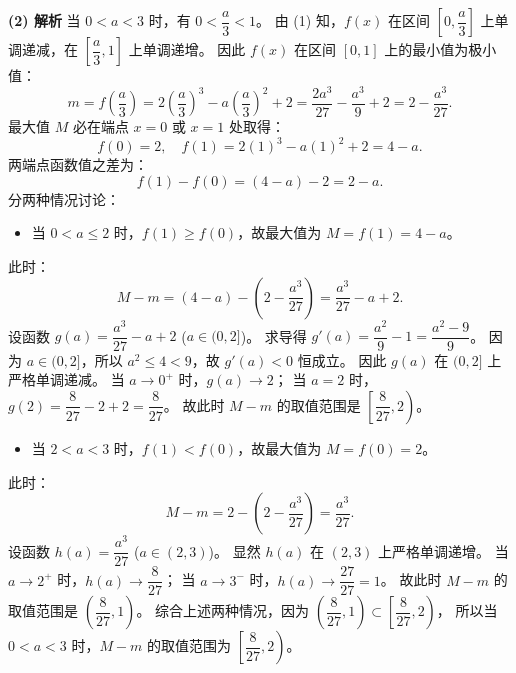 \begin{answer}
\textbf{(2) 解析}
当 $0 < a < 3$ 时，有 $0 < \dfrac{a}{3} < 1$。
由 (1) 知，$f(x)$ 在区间 $\left[0, \dfrac{a}{3}\right]$ 上单调递减，在 $\left[\dfrac{a}{3}, 1\right]$ 上单调递增。
因此 $f(x)$ 在区间 $[0, 1]$ 上的最小值为极小值：
\nopagebreak[4]
\[m = f\left(\frac{a}{3}\right) = 2\left(\frac{a}{3}\right)^3 - a\left(\frac{a}{3}\right)^2 + 2 = \frac{2a^3}{27} - \frac{a^3}{9} + 2 = 2 - \frac{a^3}{27}.\]
最大值 $M$ 必在端点 $x = 0$ 或 $x = 1$ 处取得：
\nopagebreak[4]
\[f(0) = 2, \quad f(1) = 2(1)^3 - a(1)^2 + 2 = 4 - a.\]
两端点函数值之差为：
\nopagebreak[4]
\[f(1) - f(0) = (4 - a) - 2 = 2 - a.\]
分两种情况讨论：
\begin{itemize}
\item 当 $0 < a \leqslant 2$ 时，$f(1) \geqslant f(0)$，故最大值为 $M = f(1) = 4 - a$。
\end{itemize}
  此时：
\nopagebreak[4]
\[M - m = (4 - a) - \left(2 - \frac{a^3}{27}\right) = \frac{a^3}{27} - a + 2.\]
  设函数 $g(a) = \dfrac{a^3}{27} - a + 2$ ($a \in (0, 2]$)。
  求导得 $g'(a) = \dfrac{a^2}{9} - 1 = \dfrac{a^2 - 9}{9}$。
  因为 $a \in (0, 2]$，所以 $a^2 \leqslant 4 < 9$，故 $g'(a) < 0$ 恒成立。
  因此 $g(a)$ 在 $(0, 2]$ 上严格单调递减。
  当 $a \to 0^+$ 时，$g(a) \to 2$；
  当 $a = 2$ 时，$g(2) = \dfrac{8}{27} - 2 + 2 = \dfrac{8}{27}$。
  故此时 $M - m$ 的取值范围是 $\left[\dfrac{8}{27}, 2\right)$。
\begin{itemize}
\item 当 $2 < a < 3$ 时，$f(1) < f(0)$，故最大值为 $M = f(0) = 2$。
\end{itemize}
  此时：
\nopagebreak[4]
\[M - m = 2 - \left(2 - \frac{a^3}{27}\right) = \frac{a^3}{27}.\]
  设函数 $h(a) = \dfrac{a^3}{27}$ ($a \in (2, 3)$)。
  显然 $h(a)$ 在 $(2, 3)$ 上严格单调递增。
  当 $a \to 2^+$ 时，$h(a) \to \dfrac{8}{27}$；
  当 $a \to 3^-$ 时，$h(a) \to \dfrac{27}{27} = 1$。
  故此时 $M - m$ 的取值范围是 $\left(\dfrac{8}{27}, 1\right)$。
综合上述两种情况，因为 $\left(\dfrac{8}{27}, 1\right) \subset \left[\dfrac{8}{27}, 2\right)$，
所以当 $0 < a < 3$ 时，$M - m$ 的取值范围为 $\left[\dfrac{8}{27}, 2\right)$。


\gkanswer{答案（2）：$\left[\dfrac{8}{27}, 2\right)$}

\end{answer}
